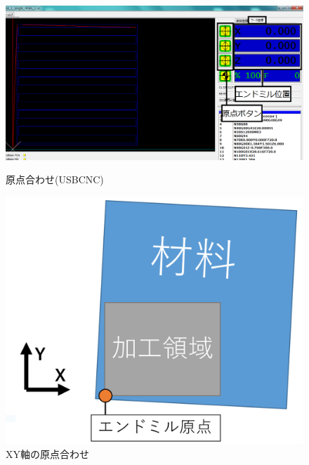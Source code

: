 \documentclass[b5paper, 9pt, twocolumn, titlepage,openany]{jsbook}%
\begin{document}
\begin{figure}[tbh]
  \begin{center}
    \begin{minipage}{0.6\columnwidth}
      \includegraphics[width=\columnwidth]{zeropoint_trim.png}
    \end{minipage}
    \caption{原点合わせ(USBCNC)\label{zeropoint}}
    \begin{minipage}{0.6\columnwidth}
      \includegraphics[width=\columnwidth]{milling_image.png}
    \end{minipage}
    \caption{XY軸の原点合わせ\label{milling_image}}
  \end{center}
\end{figure}


\clearpage
\end{document}
